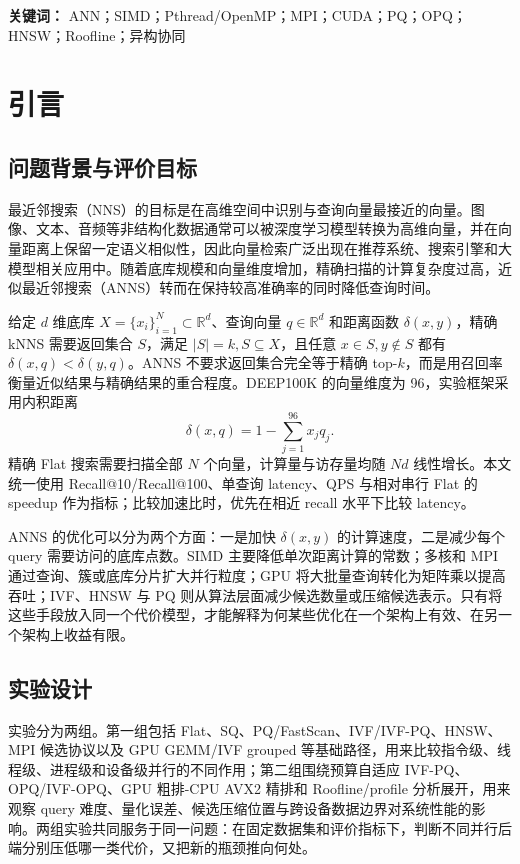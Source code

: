 \documentclass[a4paper,11pt,UTF8]{ctexart}
\begin{document}
\noindent\textbf{关键词：} ANN；SIMD；Pthread/OpenMP；MPI；CUDA；PQ；OPQ；HNSW；Roofline；异构协同

\section{引言}

\subsection{问题背景与评价目标}

最近邻搜索（NNS）的目标是在高维空间中识别与查询向量最接近的向量。图像、文本、音频等非结构化数据通常可以被深度学习模型转换为高维向量，并在向量距离上保留一定语义相似性，因此向量检索广泛出现在推荐系统、搜索引擎和大模型相关应用中。随着底库规模和向量维度增加，精确扫描的计算复杂度过高，近似最近邻搜索（ANNS）转而在保持较高准确率的同时降低查询时间。

给定 $d$ 维底库 $X=\{x_i\}_{i=1}^{N}\subset\mathbb{R}^{d}$、查询向量 $q\in\mathbb{R}^{d}$ 和距离函数 $\delta(x,y)$，精确 kNNS 需要返回集合 $S$，满足 $|S|=k,S\subseteq X$，且任意 $x\in S,y\notin S$ 都有 $\delta(x,q)<\delta(y,q)$。ANNS 不要求返回集合完全等于精确 top-$k$，而是用召回率衡量近似结果与精确结果的重合程度。DEEP100K\cite{babenko2016deep} 的向量维度为 96，实验框架采用内积距离
\[
  \delta(x,q)=1-\sum_{j=1}^{96}x_j q_j .
\]
精确 Flat 搜索需要扫描全部 $N$ 个向量，计算量与访存量均随 $N d$ 线性增长。本文统一使用 Recall@10/Recall@100、单查询 latency、QPS 与相对串行 Flat 的 speedup 作为指标；比较加速比时，优先在相近 recall 水平下比较 latency。

ANNS 的优化可以分为两个方面：一是加快 $\delta(x,y)$ 的计算速度，二是减少每个 query 需要访问的底库点数。SIMD 主要降低单次距离计算的常数；多核和 MPI 通过查询、簇或底库分片扩大并行粒度；GPU 将大批量查询转化为矩阵乘以提高吞吐；IVF\cite{sivic2003ivf}、HNSW\cite{malkov2018hnsw} 与 PQ\cite{jegou2011pq} 则从算法层面减少候选数量或压缩候选表示。只有将这些手段放入同一个代价模型，才能解释为何某些优化在一个架构上有效、在另一个架构上收益有限。

\subsection{实验设计}

实验分为两组。第一组包括 Flat、SQ、PQ/FastScan\cite{andre2017fastscan}、IVF/IVF-PQ、HNSW、MPI 候选协议以及 GPU GEMM/IVF grouped\cite{johnson2021faiss} 等基础路径，用来比较指令级、线程级、进程级和设备级并行的不同作用；第二组围绕预算自适应 IVF-PQ、OPQ/IVF-OPQ\cite{ge2013opq}、GPU 粗排-CPU AVX2 精排和 Roofline/profile 分析展开，用来观察 query 难度、量化误差、候选压缩位置与跨设备数据边界对系统性能的影响。两组实验共同服务于同一问题：在固定数据集和评价指标下，判断不同并行后端分别压低哪一类代价，又把新的瓶颈推向何处。
\end{document}
